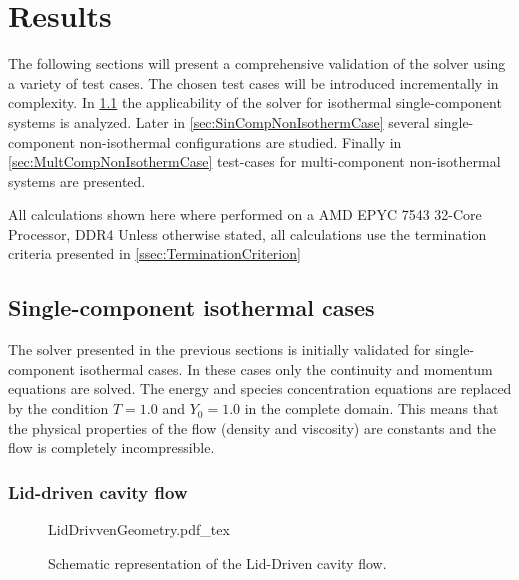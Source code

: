 \chapter{Results}	\label{ch:results}
\glsresetall
The following sections will present a comprehensive validation of the solver using a variety of test cases. The chosen test cases will be introduced incrementally in complexity. In \cref{sec:SingleCompIsotCase} the applicability of the solver for isothermal single-component systems is analyzed. Later in \cref{sec:SinCompNonIsothermCase} several single-component non-isothermal configurations are studied. Finally in \cref{sec:MultCompNonIsothermCase} test-cases for multi-component non-isothermal systems are presented.



All calculations shown here where performed on a  AMD EPYC 7543 32-Core Processor, DDR4 %
Unless otherwise stated, all calculations use the termination criteria presented in \cref{ssec:TerminationCriterion}

\section{Single-component isothermal cases}\label{sec:SingleCompIsotCase}
The solver presented in the previous sections is initially validated for single-component isothermal cases. In these cases only the continuity and momentum equations are solved. The energy and species concentration equations  are replaced by the condition $T = 1.0$ and $Y_0 = 1.0$ in the complete domain. This means that the physical properties of the flow (density and viscosity) are constants and the flow is completely incompressible.

\subsection{Lid-driven cavity flow}
\begin{figure}[b]
	\begin{center}
		\def\svgwidth{0.3\textwidth}
		{LidDrivvenGeometry.pdf_tex}
		\caption{Schematic representation of the Lid-Driven cavity flow.}
		\label{fig:LidDrivenCavity}
	\end{center}
\end{figure}

